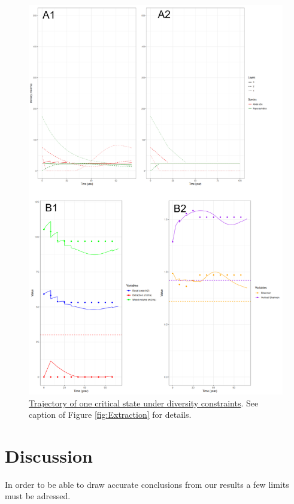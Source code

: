 \documentclass{article}
\begin{document}
\begin{figure}[b]
    \centering
    \includegraphics[height=0.9\textheight]{Figure/Results/Diversity.png}
    \caption{\underline{Trajectory of one critical state under diversity constraints}. See caption of Figure \ref{fig:Extraction} for details.}
    \label{fig:Diversity}
\end{figure}

\clearpage

\section{Discussion}

In order to be able to draw accurate conclusions from our results a few limits must be adressed. 
\end{document}
